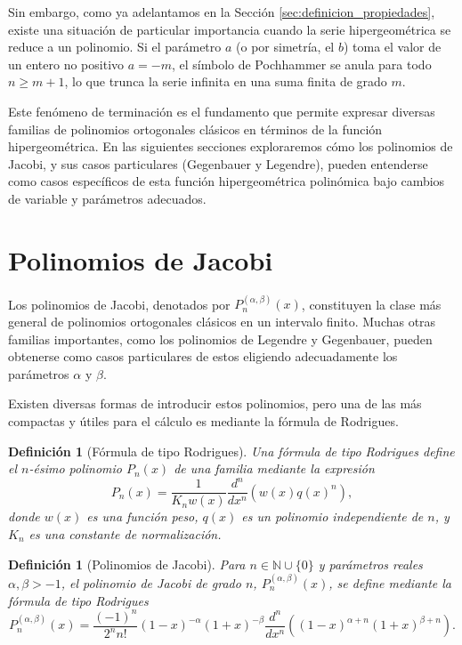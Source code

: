 \documentclass[12pt,a4paper]{book}
\newtheorem{definition}[theorem]{Definición}
\begin{document}
Sin embargo, como ya adelantamos en la Sección \ref{sec:definicion_propiedades}, existe una situación de particular importancia cuando la serie hipergeométrica se reduce a un polinomio. Si el parámetro $a$ (o por simetría, el $b$) toma el valor de un entero no positivo $a = -m$, el símbolo de Pochhammer se anula para todo $n \ge m+1$, lo que trunca la serie infinita en una suma finita de grado $m$. 

Este fenómeno de terminación es el fundamento que permite expresar diversas familias de polinomios ortogonales clásicos en términos de la función hipergeométrica. En las siguientes secciones exploraremos cómo los polinomios de Jacobi, y sus casos particulares (Gegenbauer y Legendre), pueden entenderse como casos específicos de esta función hipergeométrica polinómica bajo cambios de variable y parámetros adecuados.

\section{Polinomios de Jacobi}
\label{sec:polinomios_jacobi}

Los polinomios de Jacobi, denotados por $P_n^{(\alpha, \beta)}(x)$, constituyen la clase más general de polinomios ortogonales clásicos en un intervalo finito. Muchas otras familias importantes, como los polinomios de Legendre y Gegenbauer, pueden obtenerse como casos particulares de estos eligiendo adecuadamente los parámetros $\alpha$ y $\beta$.

Existen diversas formas de introducir estos polinomios, pero una de las más compactas y útiles para el cálculo es mediante la fórmula de Rodrigues.

\begin{definition}[Fórmula de tipo Rodrigues]
\label{def:rodrigues}
Una fórmula de tipo Rodrigues define el $n$-ésimo polinomio $P_n(x)$ de una familia mediante la expresión
\begin{equation*}
    P_n(x) = \frac{1}{K_n w(x)} \frac{d^n}{dx^n} \left( w(x) q(x)^n \right),
\end{equation*}
donde $w(x)$ es una función peso, $q(x)$ es un polinomio independiente de $n$, y $K_n$ es una constante de normalización.
\end{definition}

\begin{definition}[Polinomios de Jacobi]
\label{def:jacobi_rodrigues}
Para $n \in \mathbb{N} \cup \{0\}$ y parámetros reales $\alpha, \beta > -1$, el polinomio de Jacobi de grado $n$, $P_n^{(\alpha, \beta)}(x)$, se define mediante la fórmula de tipo Rodrigues
\begin{equation*}
    P_n^{(\alpha, \beta)}(x) = \frac{(-1)^n}{2^n n!} (1-x)^{-\alpha} (1+x)^{-\beta} \frac{d^n}{dx^n} ((1-x)^{\alpha+n} (1+x)^{\beta+n}).
\end{equation*}
\end{definition}
\end{document}
